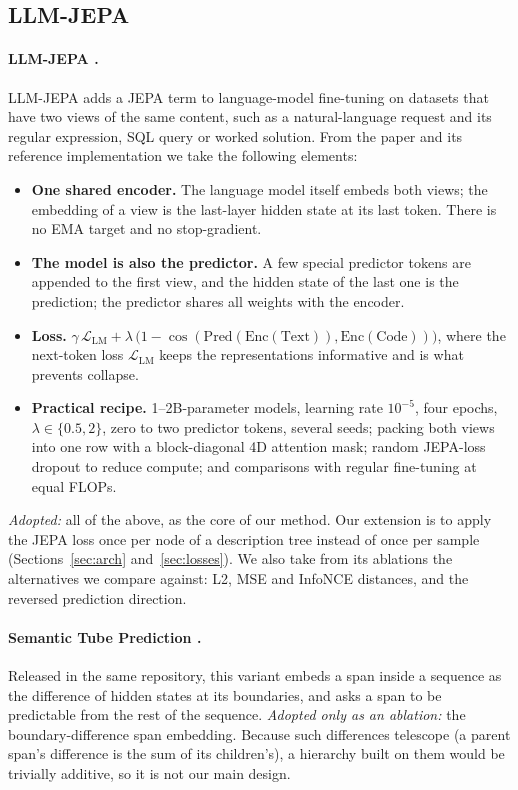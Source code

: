\documentclass[11pt]{article}
\newcommand{\Lcal}{\mathcal{L}}
\begin{document}
\subsection{LLM-JEPA}

\paragraph{LLM-JEPA \citep{huang2025llmjepa}.}
LLM-JEPA adds a JEPA term to language-model fine-tuning on datasets that have two views of the same content, such as
a natural-language request and its regular expression, SQL query or worked solution. From the paper and its
reference implementation we take the following elements:
\begin{itemize}
  \item \textbf{One shared encoder.} The language model itself embeds both views; the embedding of a view is the
        last-layer hidden state at its last token. There is no EMA target and no stop-gradient.
  \item \textbf{The model is also the predictor.} A few special predictor tokens are appended to the first view,
        and the hidden state of the last one is the prediction; the predictor shares all weights with the encoder.
  \item \textbf{Loss.} $\gamma\,\Lcal_{\text{LM}} + \lambda\,\bigl(1-\cos(\mathrm{Pred}(\mathrm{Enc}(\text{Text})),
        \mathrm{Enc}(\text{Code}))\bigr)$, where the next-token loss $\Lcal_{\text{LM}}$ keeps the representations
        informative and is what prevents collapse.
  \item \textbf{Practical recipe.} 1--2B-parameter models, learning rate $10^{-5}$, four epochs, $\lambda\in\{0.5,2\}$,
        zero to two predictor tokens, several seeds; packing both views into one row with a block-diagonal 4D
        attention mask; random JEPA-loss dropout to reduce compute; and comparisons with regular fine-tuning at equal
        FLOPs.
\end{itemize}
\emph{Adopted:} all of the above, as the core of our method. Our extension is to apply the JEPA loss once per node of
a description tree instead of once per sample (Sections~\ref{sec:arch} and~\ref{sec:losses}). We also take from its
ablations the alternatives we compare against: L2, MSE and InfoNCE distances, and the reversed prediction direction.

\paragraph{Semantic Tube Prediction \citep{llmjepa2025stp}.}
Released in the same repository, this variant embeds a span inside a sequence as the difference of hidden states at
its boundaries, and asks a span to be predictable from the rest of the sequence.
\emph{Adopted only as an ablation:} the boundary-difference span embedding. Because such differences telescope (a
parent span's difference is the sum of its children's), a hierarchy built on them would be trivially additive, so it
is not our main design.
\end{document}
